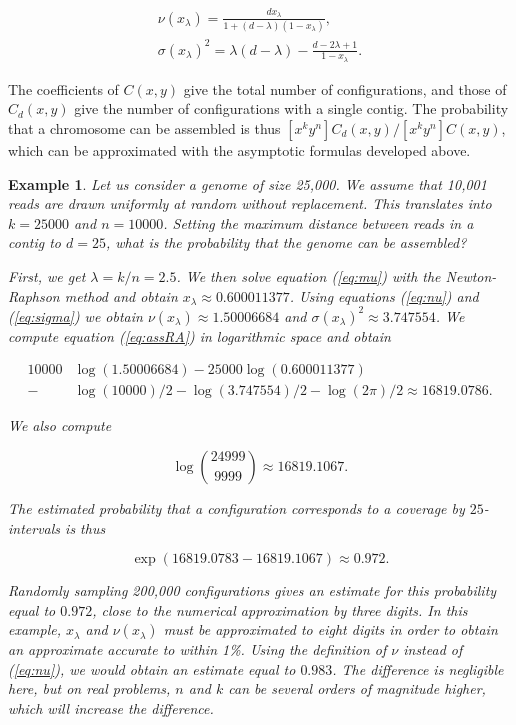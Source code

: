 \documentclass{article}
\newtheorem{example}{Example}
\begin{document}
\begin{gather}
\label{eq:nu} %
\nu(x_\lambda) = \frac{dx_\lambda}{1+(d-\lambda)(1-x_\lambda)}, \\
\label{eq:sigma} %
\sigma(x_\lambda)^2 = \lambda(d-\lambda) -
  \frac{d-2\lambda+1}{1-x_\lambda}.
\end{gather}

The coefficients of $C(x,y)$ give the total number of configurations, and
those of $C_d(x,y)$ give the number of configurations with a single
contig. The probability that a chromosome can be assembled is thus
$[x^ky^n] C_d(x,y) / [x^ky^n] C(x,y)$, which can be approximated with the
asymptotic formulas developed above.

\begin{example}
Let us consider a genome of size 25,000. We assume that 10,001 reads are
drawn uniformly at random without replacement. This translates into
$k=25000$ and $n=10000$. Setting the maximum distance between reads in a
contig to $d=25$, what is the probability that the genome can be
assembled?

First, we get $\lambda = k/n = 2.5$. We then solve equation (\ref{eq:mu})
with the Newton-Raphson method and obtain $x_\lambda \approx 0.600011377$.
Using equations (\ref{eq:nu}) and (\ref{eq:sigma}) we obtain
$\nu(x_\lambda) \approx 1.50006684$ and $\sigma(x_\lambda)^2 \approx
3.747554$. We compute equation (\ref{eq:assRA}) in logarithmic space and
obtain

\begin{equation*}
\begin{split}
10000&\log(1.50006684) - 25000\log(0.600011377) \\
- &\log(10000)/2 - \log(3.747554)/2 - \log(2\pi)/2
\approx 16819.0786.
\end{split}
\end{equation*}

We also compute 

\begin{equation*}
\log { 24999 \choose 9999 } \approx 16819.1067.
\end{equation*}

The estimated probability that a configuration corresponds to a coverage
by $25$-intervals is thus

\begin{equation*}
\exp(16819.0783-16819.1067) \approx 0.972.
\end{equation*}

Randomly sampling 200,000 configurations gives an estimate for this
probability equal to $0.972$, close to the numerical approximation by
three digits. In this example, $x_\lambda$ and $\nu(x_\lambda)$ must be
approximated to eight digits in order to obtain an approximate accurate to
within 1\%. Using the definition of $\nu$ instead of (\ref{eq:nu}), we
would obtain an estimate equal to $0.983$. The difference is negligible
here, but on real problems, $n$ and $k$ can be several orders of magnitude
higher, which will increase the difference.
\end{example}
\end{document}
